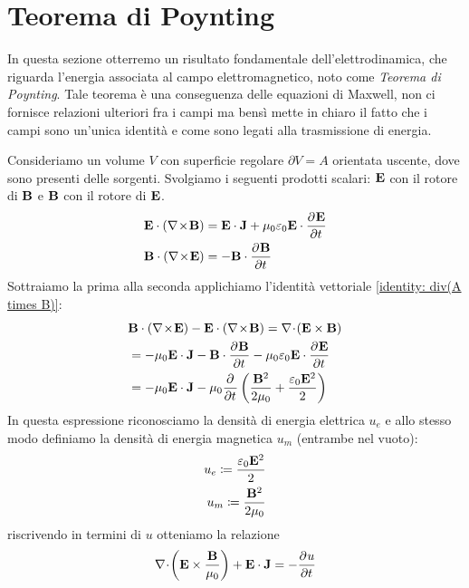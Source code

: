 \section{Teorema di Poynting}
In questa sezione otterremo un risultato fondamentale dell'elettrodinamica, che riguarda l'energia associata al campo elettromagnetico, noto 
come \textit{Teorema di Poynting}. Tale teorema è una conseguenza delle equazioni di Maxwell, non ci fornisce relazioni ulteriori fra i campi 
ma bensì mette in chiaro il fatto che i campi sono un'unica identità e come sono legati alla trasmissione di energia.

Consideriamo un volume $ V $ con superficie regolare $ \partial V = A $ orientata uscente, dove sono presenti delle sorgenti. 
Svolgiamo i seguenti prodotti scalari: $ \mathbf{ E } $ con il rotore di $ \mathbf{ B } $ e $ \mathbf{ B } $ con il rotore di $ \mathbf{ E } $.
\begin{align}
  \mathbf{ E } \cdot \left( \nabla\!\times\!\mathbf{ B } \right) &= 
  \mathbf{ E } \cdot \mathbf{ J } + \mu_0 \varepsilon_0 \mathbf{ E } \cdot \frac{\partial^{} {\mathbf{ E }}}{\partial {t}^{}}
  \\
  \mathbf{ B } \cdot \left(\nabla\!\times\!\mathbf{ E } \right) &= - \mathbf{ B } \cdot \frac{\partial^{} {\mathbf{ B }}}{\partial {t}^{}}
\end{align}
Sottraiamo la prima alla seconda applichiamo l'identità vettoriale \eqref{identity: div(A times B)}:
\begin{align}
  &\mathbf{ B } \cdot \left(\nabla\!\times\!\mathbf{ E } \right) - \mathbf{ E } \cdot \left( \nabla\!\times\!\mathbf{ B } \right) 
  = \nabla \! \cdot \! \left( \mathbf{ E\times B } \right) 
  \\
  &= - \mu_0 \mathbf{ E \cdot J } - \mathbf{ B } \cdot \frac{\partial^{} {\mathbf{ B }}}{\partial {t}^{}} - \mu_0 \varepsilon_0 \mathbf{ E } \cdot \frac{\partial^{} {\mathbf{ E }}}{\partial {t}^{}}
  \\
  &= - \mu_0 \mathbf{ E \cdot J} - \mu_0 \frac{\partial^{} {}}{\partial {t}^{}} \left( \frac{\mathbf{ B }^2}{2\mu_0} +  \frac{\varepsilon_0\mathbf{ E }^2}{2} \right)
\end{align}
In questa espressione riconosciamo la densità di energia elettrica $ u_e $ e allo stesso modo definiamo la densità di energia magnetica $ u_m $ 
(entrambe nel vuoto):
\begin{align}
  u_e \coloneqq  \frac{\varepsilon_0\mathbf{ E }^2}{2}
  \\
  u_m \coloneqq \frac{\mathbf{ B }^2}{2\mu_0}
\end{align}
riscrivendo in termini di $ u $ otteniamo la relazione
\begin{align} \label{eq:teorema_di_Poynting_locale}
  \nabla\! \cdot \! \left( \mathbf{ E } \times \frac{\mathbf{ B }}{\mu_0} \right) + \mathbf{ E \cdot J } = - \frac{\partial^{} {u}}{\partial {t}^{}}
\end{align}
